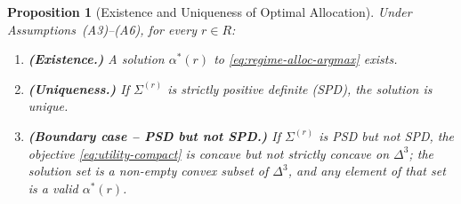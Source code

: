 \documentclass[12pt,openany]{book}
\numberwithin{equation}{chapter}
\theoremstyle{plain}
\newtheorem{proposition}[theorem]{Proposition}
\theoremstyle{definition}
\theoremstyle{remark}
\numberwithin{equation}{chapter}
\theoremstyle{plain}
\newcommand{\calR}{\mathcal{R}}
\def\calR{R}%
\begin{document}
\begin{proposition}[Existence and Uniqueness of Optimal Allocation]
\label{prop:alloc-exist-unique}
Under Assumptions~(A3)--(A6), for every $r \in \calR$:
\begin{enumerate}
  \item \textbf{(Existence.)}  A solution $\alpha^{*}(r)$ to
        \eqref{eq:regime-alloc-argmax} exists.

  \item \textbf{(Uniqueness.)}  If $\Sigma^{(r)}$ is strictly positive
        definite (SPD), the solution is unique.

  \item \textbf{(Boundary case -- PSD but not SPD.)}
        If $\Sigma^{(r)}$ is PSD but not SPD, the objective
        \eqref{eq:utility-compact} is concave but not strictly concave
        on $\Delta^{3}$; the solution set is a non-empty convex subset
        of $\Delta^{3}$, and any element of that set is a valid
        $\alpha^{*}(r)$.
\end{enumerate}
\end{proposition}
\end{document}
